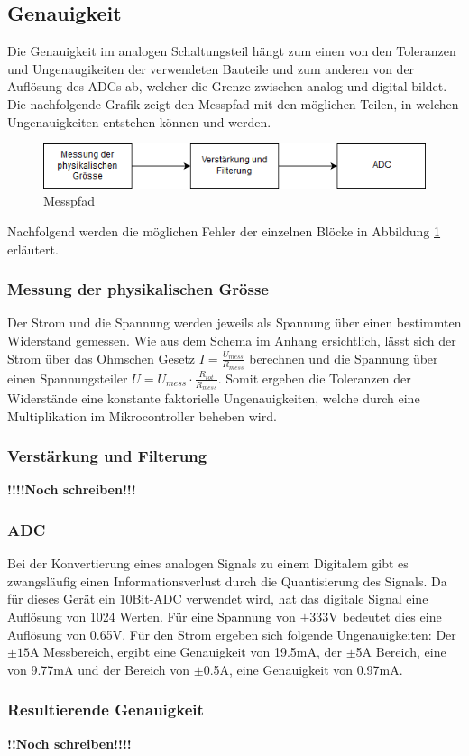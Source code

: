 \subsection{Genauigkeit}%
Die Genauigkeit im analogen Schaltungsteil hängt zum einen von den Toleranzen und Ungenaugikeiten der verwendeten Bauteile und zum anderen von der Auflösung des ADCs ab, welcher die Grenze zwischen analog und digital bildet. Die nachfolgende Grafik zeigt den Messpfad mit den möglichen Teilen, in welchen Ungenauigkeiten entstehen können und werden.

\begin{figure}[htb]

	\includegraphics[width=160mm]{images/genauigkeit.png}

	\caption{Messpfad} %
  
	\label{fig:genauigkeit}

\end{figure}

Nachfolgend werden die möglichen Fehler der einzelnen Blöcke in Abbildung \ref{fig:genauigkeit} erläutert.

\subsubsection*{Messung der physikalischen Grösse}
Der Strom und die Spannung werden jeweils als Spannung über einen bestimmten Widerstand gemessen. Wie aus dem Schema im Anhang ersichtlich, lässt sich der Strom über das Ohmschen Gesetz $I = \frac{U_{mess}}{R_{mess}}$ berechnen und die Spannung über einen Spannungsteiler $U = U_{mess} \cdot \frac{R_{tot}}{R_{mess}}$. Somit ergeben die Toleranzen der Widerstände eine konstante faktorielle Ungenauigkeiten, welche durch eine Multiplikation im Mikrocontroller beheben wird.

\subsubsection*{Verstärkung und Filterung}
\textbf{!!!!Noch schreiben!!!}

\subsubsection*{ADC}
Bei der Konvertierung eines analogen Signals zu einem Digitalem gibt es zwangsläufig einen Informationsverlust durch die Quantisierung des Signals. Da für dieses Gerät ein 10Bit-ADC verwendet wird, hat das digitale Signal eine Auflösung von 1024 Werten. Für eine Spannung von $\pm$333V bedeutet dies eine Auflösung von 0.65V. Für den Strom ergeben sich folgende Ungenauigkeiten: Der $\pm 15$A Messbereich, ergibt eine Genauigkeit von 19.5mA, der $\pm$5A Bereich, eine von 9.77mA und der Bereich von $\pm$0.5A, eine Genauigkeit von 0.97mA.

\subsubsection*{Resultierende Genauigkeit} 
\textbf{!!Noch schreiben!!!!}






\pagebreak